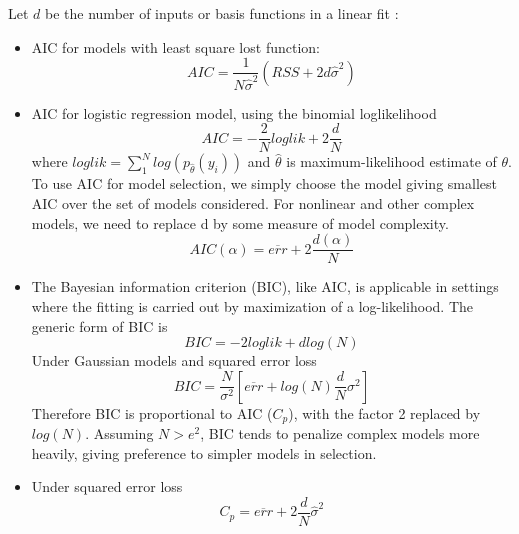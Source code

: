 \begin{deff}{}
Let $d$ be the number of inputs or basis functions in a linear fit
:
\begin{itemize}
\item AIC for models with least square lost function:
\begin{equation}\label{eq:AICLS}
AIC = \frac{1}{N \hat \sigma^2} (RSS + 2d \hat \sigma^2)
\end{equation}

\item AIC for logistic regression model, using the binomial loglikelihood
\begin{equation}\label{eq:AICLogistic}
AIC = -\frac{2}{N}loglik+ 2\frac{d}{N}
\end{equation}
where $loglik = \sum_1^N log(p_{\hat \theta}(y_i))$ and $\hat \theta$ is
maximum-likelihood estimate of $\theta$.
To use AIC for model selection, we simply choose the model giving 
smallest AIC over the set of models considered. 
For nonlinear and other complex models, we need to replace d by 
some measure of model complexity.
\begin{equation}\label{eq:AICLogisticnonlinear}
AIC(\alpha) = \overline{err}  + 2\frac{d(\alpha)}{N}
\end{equation}

\item The Bayesian information criterion (BIC), like AIC, 
is applicable in settings where the fitting is carried out by 
maximization of a log-likelihood. The generic form of BIC is
\begin{equation}\label{eq:BICGeneral}
BIC = -2 loglik + d log(N)
\end{equation}
Under Gaussian models and squared error loss
\begin{equation}\label{eq:BICGussianSE}
BIC = \frac{N}{\sigma^2} [ \overline{err} + log(N) \frac{d}{N}\sigma^2]
\end{equation}
Therefore BIC is proportional to AIC ($C_p$), with the factor 2 
replaced by $log(N)$. Assuming $N > e^2$, BIC tends to 
penalize complex models more heavily, giving preference 
to simpler models in selection.

\item Under squared error loss
\begin{equation}\label{eq:CPSE}
C_p = \overline{err} + 2\frac{d}{N}\hat \sigma^2
\end{equation}

\end{itemize}
\end{deff}


